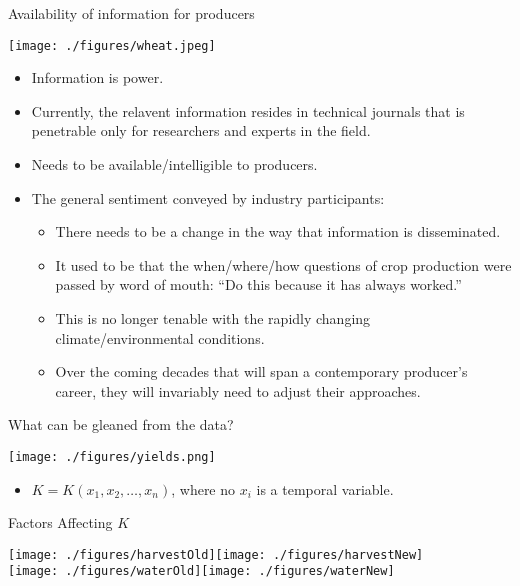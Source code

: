 \documentclass[t,9pt,aspectratio=169]{beamer}
\begin{document}
\begin{frame}{Availability of information for producers}

\begin{center}
\texttt{[image: ./figures/wheat.jpeg]}
\end{center}

\begin{itemize}
 \item Information is power.
 \item Currently, the relavent information resides in technical journals that is penetrable only for researchers and experts in the field. 
 \item Needs to be available/intelligible to producers.
 \item The general sentiment conveyed by industry participants:
 \begin{itemize}
 \item There needs to be a change in the way that information is disseminated.
 \item It used to be that the when/where/how questions of crop production were passed by word of mouth: ``Do this because it has always worked.''
 \item This is no longer tenable with the rapidly changing climate/environmental conditions.
 \item Over the coming decades that will span a contemporary producer's career, they will invariably need to adjust their approaches.
 \end{itemize}
\end{itemize}

\end{frame}

\begin{frame}{What can be gleaned from the data?}
 
 \begin{center}
\texttt{[image: ./figures/yields.png]}
 \end{center}
 
 \begin{itemize}
  \item $K = K(x_1, x_2, \dots, x_n)$, where no $x_i$ is a temporal variable.
 \end{itemize}
 
\end{frame}

\begin{frame}{Factors Affecting $K$}

\begin{center}

 \texttt{[image: ./figures/harvestOld]}\texttt{[image: ./figures/harvestNew]}\\
 \texttt{[image: ./figures/waterOld]}\texttt{[image: ./figures/waterNew]}
 
\end{center}
 
\end{frame}
\end{document}
